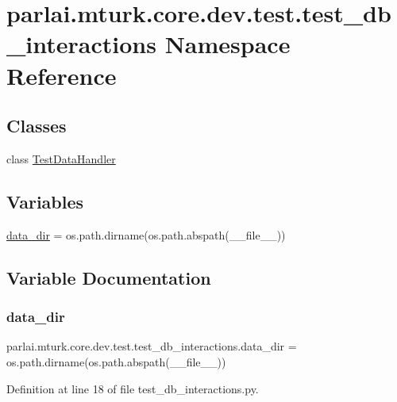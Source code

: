 \hypertarget{namespaceparlai_1_1mturk_1_1core_1_1dev_1_1test_1_1test__db__interactions}{}\section{parlai.\+mturk.\+core.\+dev.\+test.\+test\+\_\+db\+\_\+interactions Namespace Reference}
\label{namespaceparlai_1_1mturk_1_1core_1_1dev_1_1test_1_1test__db__interactions}
\subsection*{Classes}
\begin{DoxyCompactItemize}
\item 
class \hyperlink{classparlai_1_1mturk_1_1core_1_1dev_1_1test_1_1test__db__interactions_1_1TestDataHandler}{Test\+Data\+Handler}
\end{DoxyCompactItemize}
\subsection*{Variables}
\begin{DoxyCompactItemize}
\item 
\hyperlink{namespaceparlai_1_1mturk_1_1core_1_1dev_1_1test_1_1test__db__interactions_a1f7ad55ce9f58b4a346558e02060ce66}{data\+\_\+dir} = os.\+path.\+dirname(os.\+path.\+abspath(\+\_\+\+\_\+file\+\_\+\+\_\+))
\end{DoxyCompactItemize}


\subsection{Variable Documentation}
\mbox{\label{namespaceparlai_1_1mturk_1_1core_1_1dev_1_1test_1_1test__db__interactions_a1f7ad55ce9f58b4a346558e02060ce66}} 
\subsubsection{\texorpdfstring{data\+\_\+dir}{data\_dir}}
{\footnotesize\ttfamily parlai.\+mturk.\+core.\+dev.\+test.\+test\+\_\+db\+\_\+interactions.\+data\+\_\+dir = os.\+path.\+dirname(os.\+path.\+abspath(\+\_\+\+\_\+file\+\_\+\+\_\+))}



Definition at line 18 of file test\+\_\+db\+\_\+interactions.\+py.


